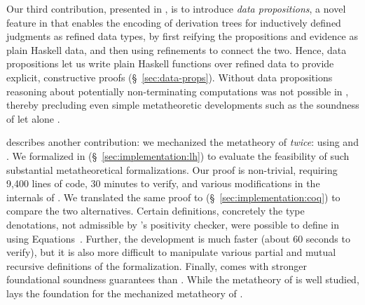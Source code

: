 %
Our third contribution,
presented in , is to introduce 
\textit{data propositions}, a novel feature in \lh
that enables the encoding of derivation trees for inductively
defined judgments as refined data types, by first reifying
the propositions and evidence as plain Haskell data, and then
using refinements to connect the two.
%
Hence, data propositions let us write plain Haskell functions
over refined data to provide explicit, 
constructive proofs (\S~\ref{sec:data-props}).              %
%
Without data propositions reasoning about
potentially non-terminating computations was not possible in \lh,
thereby precluding even simple
metatheoretic developments such as the soundness
of \sysf let alone \sysrf.

%
 describes another contribution:
we mechanized the metatheory
of \sysrf \emph{twice}: using \lh and \coq.
%
We formalized \sysrf in \lh (\S~\ref{sec:implementation:lh}) %
to evaluate the feasibility of such
substantial metatheoretical formalizations.
%
Our proof is non-trivial, requiring 9,400 lines
of code, 30 minutes to verify, and various modifications
in the  internals of \lh.
%
We translated the same proof 
to \coq (\S~\ref{sec:implementation:coq})             %
to compare the two alternatives.
%
Certain definitions, concretely the type denotations,
not admissible by \lh's positivity checker,
were possible to define in \coq using Equations~\cite{10.1145/3341690}.
%
Further, the \coq development is
much faster (about 60 seconds to verify),
but it is also more difficult to manipulate various
partial and mutual recursive definitions of the formalization.
%
Finally, \coq comes with stronger foundational
soundness guarantees than \lh.
%
While the metatheory of \coq is well studied,
\sysrf lays the foundation for the mechanized metatheory of \lh.

%

